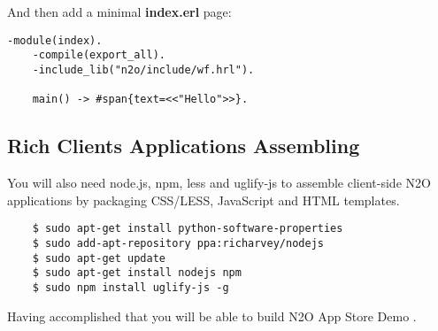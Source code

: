 And then add a minimal {\bf index.erl} page:

\begin{lstlisting}[caption=index.erl]
    -module(index).
    -compile(export_all).
    -include_lib("n2o/include/wf.hrl").

    main() -> #span{text=<<"Hello">>}.
\end{lstlisting}

\subsection{Rich Clients Applications Assembling}
You will also need node.js, npm, less and uglify-js to assemble
client-side N2O applications by packaging CSS/LESS, JavaScript and HTML templates.

\vspace{1\baselineskip}
\begin{lstlisting}
    $ sudo apt-get install python-software-properties
    $ sudo add-apt-repository ppa:richarvey/nodejs
    $ sudo apt-get update
    $ sudo apt-get install nodejs npm
    $ sudo npm install uglify-js -g
\end{lstlisting}
\vspace{1\baselineskip}

Having accomplished that you will be able to build N2O App Store
Demo \newline{}.
